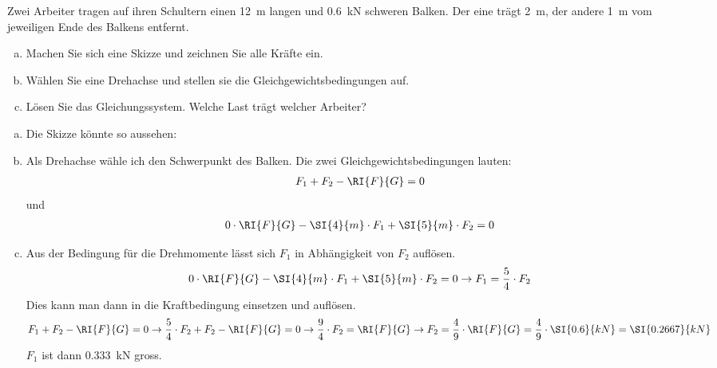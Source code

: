 
\begin{aufgabe}
	Zwei Arbeiter tragen auf ihren Schultern einen \SI{12}{m} langen und \SI{0.6}{kN}
	schweren Balken. Der eine trägt \SI{2}{m}, der andere \SI{1}{m} vom jeweiligen Ende des Balkens entfernt.
	\begin{enumerate} [a)]
		\item Machen Sie sich eine Skizze und zeichnen Sie alle Kräfte ein.
		\item Wählen Sie eine Drehachse und stellen sie die Gleichgewichtsbedingungen auf.
		\item Lösen Sie das Gleichungssystem. Welche Last trägt welcher Arbeiter?
	\end{enumerate}

	\begin{loesung}
		\begin{enumerate} [a)]
			\item Die Skizze könnte so aussehen:
				\begin{center}
				\end{center}
			\item Als Drehachse wähle ich den Schwerpunkt des Balken. Die zwei Gleichgewichtsbedingungen lauten:
				\begin{eqnarray*}
					F_1 + F_2 - \RI{F}{G} =0
				\end{eqnarray*}
				und
				\begin{eqnarray*}
					0\cdot\RI{F}{G} - \SI{4}{m}\cdot F_1 + \SI{5}{m}\cdot F_2 =0
				\end{eqnarray*}
			\item Aus der Bedingung für die Drehmomente lässt sich $F_1$ in Abhängigkeit von $F_2$ auflösen.
				\begin{eqnarray*}
					0\cdot\RI{F}{G} - \SI{4}{m}\cdot F_1 + \SI{5}{m}\cdot F_2 =0 \to F_1 =  \frac{5}{4}\cdot F_2
				\end{eqnarray*}
				Dies kann man dann in die Kraftbedingung einsetzen und auflösen.
				\begin{eqnarray*}
					F_1 + F_2 - \RI{F}{G} =0\to  \frac{5}{4}\cdot F_2 + F_2 - \RI{F}{G} =0\to  \frac{9}{4}\cdot F_2 =\RI{F}{G}\to F_2=\frac{4}{9}\cdot\RI{F}{G}=\frac{4}{9}\cdot\SI{0.6}{kN}=\SI{0.2667}{kN}
				\end{eqnarray*}
				$F_1$ ist dann \SI{0.333}{kN} gross.

		\end{enumerate}
	\end{loesung}
\end{aufgabe}
